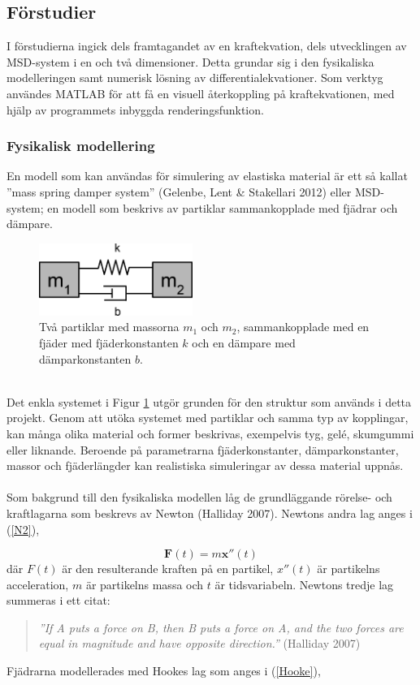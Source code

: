\documentclass[a4paper,12pt,oneside,final,swedish]{extarticle}
\begin{document}
\subsection{Förstudier}
I förstudierna ingick dels framtagandet av en kraftekvation, dels utvecklingen av MSD-system i en och två dimensioner. Detta grundar sig i den fysikaliska modelleringen samt numerisk lösning av differentialekvationer. Som verktyg användes MATLAB för att få en visuell återkoppling på kraftekvationen, med hjälp av programmets inbyggda renderingsfunktion.
\subsubsection{Fysikalisk modellering}
En modell som kan användas för simulering av elastiska material är ett så kallat ''mass spring damper system'' (Gelenbe, Lent \& Stakellari 2012) eller MSD-system; en modell som beskrivs av partiklar sammankopplade med fjädrar och dämpare.\\
\begin{figure}[h!]
  \begin{center}
    \includegraphics[width=5cm]{Bilder/simple1D.png} 
  \end{center}
  \caption{Två partiklar med massorna $m_1$ och $m_2$, sammankopplade med en fjäder med fjäderkonstanten $k$ och en dämpare med dämparkonstanten $b$.}
  \label{m1m2::nonfloat}
\end{figure}
\\Det enkla systemet i Figur \ref{m1m2::nonfloat} utgör grunden för den struktur som används i detta projekt. Genom att utöka systemet med partiklar och samma typ av kopplingar, kan många olika material och former beskrivas, exempelvis tyg, gelé, skumgummi eller liknande. Beroende på parametrarna fjäderkonstanter, dämparkonstanter, massor och fjäderlängder kan realistiska simuleringar av dessa material uppnås.
\\\\Som bakgrund till den fysikaliska modellen låg de grundläggande rörelse- och kraftlagarna som beskrevs av Newton (Halliday 2007). Newtons andra lag anges i (\ref{N2}),

\begin{equation}
\mathbf F(t)=m\mathbf x''(t)
\label{N2}
\end{equation}
där $F(t)$ är den resulterande kraften på en partikel, $x''(t)$ är partikelns acceleration, $m$ är partikelns massa och $t$ är tidsvariabeln. Newtons tredje lag summeras i ett citat:
\begin{quote}\begin{center}\textit{''If A puts a force on B, then B puts a force on A, and the two forces are equal in magnitude and have opposite direction.''} (Halliday 2007)\end{center}\end{quote}
Fjädrarna modellerades med Hookes lag som anges i (\ref{Hooke}),
\end{document}
